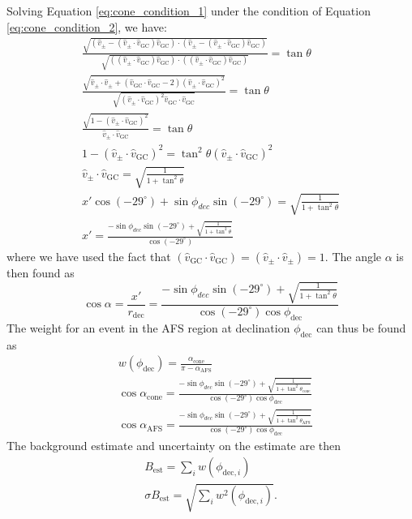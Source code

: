 Solving Equation \ref{eq:cone_condition_1} under the condition of Equation \ref{eq:cone_condition_2}, we have:
\begin{eqnarray}
\frac{\sqrt{(\hat{v}_\pm-(\hat{v}_\pm \cdot \hat{v}_\textrm{GC})\hat{v}_\textrm{GC})\cdot(\hat{v}_\pm-(\hat{v}_\pm \cdot \hat{v}_\textrm{GC})\hat{v}_\textrm{GC})}}{\sqrt{((\hat{v}_\pm \cdot \hat{v}_\textrm{GC})\hat{v}_\textrm{GC})\cdot((\hat{v}_\pm \cdot \hat{v}_\textrm{GC})\hat{v}_\textrm{GC})}}=\tan \theta\\
\frac{\sqrt{\hat{v}_\pm\cdot\hat{v}_\pm+(\hat{v}_\textrm{GC} \cdot \hat{v}_\textrm{GC}-2)(\hat{v}_\pm \cdot \hat{v}_\textrm{GC})^2 }}{\sqrt{(\hat{v}_\pm \cdot \hat{v}_\textrm{GC})^2\hat{v}_\textrm{GC} \cdot \hat{v}_\textrm{GC}}}=\tan \theta\\
\frac{\sqrt{1-(\hat{v}_\pm \cdot \hat{v}_\textrm{GC})^2}}{\hat{v}_\pm \cdot \hat{v}_\textrm{GC}}=\tan \theta \\
1-(\hat{v}_\pm \cdot \hat{v}_\textrm{GC})^2=\tan^2 \theta (\hat{v}_\pm \cdot \hat{v}_\textrm{GC})^2\\
\hat{v}_\pm \cdot \hat{v}_\textrm{GC}=\sqrt{\frac{1}{1+\tan^2\theta}}\\
x'\cos (-29^\circ)+\sin \phi_{dec} \sin (-29^\circ)=\sqrt{\frac{1}{1+\tan^2\theta}}\\
x'=\frac{-\sin \phi_{dec} \sin (-29^\circ)+\sqrt{\frac{1}{1+\tan^2\theta}}}{\cos (-29^\circ)}
\end{eqnarray}
where we have used the fact that $(\hat{v}_\textrm{GC} \cdot \hat{v}_\textrm{GC} )=(\hat{v}_\pm \cdot \hat{v}_\pm)=1$.
The angle $\alpha$ is then found as 
\begin{equation}
\cos \alpha=\frac{x'}{r_\textrm{dec}}=\frac{-\sin \phi_{dec} \sin (-29^\circ)+\sqrt{\frac{1}{1+\tan^2\theta}}}{\cos (-29^\circ) \cos \phi_\textrm{dec}}
\end{equation}
The weight for an event in the AFS region at declination $\phi_\textrm{dec}$ can thus be found as 
\begin{eqnarray}
&w(\phi_\textrm{dec})=\frac{\alpha_\textrm{cone}}{\pi-\alpha_\textrm{AFS}} \\
&\cos \alpha_\textrm{cone}=\frac{-\sin \phi_{dec} \sin (-29^\circ)+\sqrt{\frac{1}{1+\tan^2\theta_\textrm{cone}}}}{\cos (-29^\circ) \cos \phi_\textrm{dec}} \\
&\cos \alpha_\textrm{AFS}=\frac{-\sin \phi_{dec} \sin (-29^\circ)+\sqrt{\frac{1}{1+\tan^2\theta_\textrm{AFS}}}}{\cos (-29^\circ) \cos \phi_\textrm{dec}} 
\label{eq:weight}
\end{eqnarray}
The background estimate and uncertainty on the estimate are then
\begin{eqnarray}
B_\textrm{est}=\sum \limits_i w(\phi_{\textrm{dec},i})
\\
\sigma B_\textrm{est}=\sqrt{\sum \limits_i w^2(\phi_{\textrm{dec},i})}.
\label{eq:bckg_est}
\end{eqnarray}

